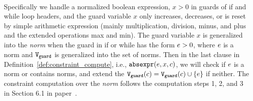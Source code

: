  \\
Specifically 
we handle a 
normalized boolean expression, $x > 0$
in guards of if and while loop headers, and 
the guard variable $x$ only increases, decreases, or is reset by 
simple arithmetic expression (mainly multiplication, division, minus, and plus and the extended operations max and min). 
The guard variable $x$ is generalized into the \emph{norm} when the guard 
in if or while has the form $e > 0$, where $e$ is a norm and $\mathtt{V}_{\mathtt{guard}}$ is generalized into the set of norms.
Then in the last clause in Definition~\ref{def:constraint_compute}, i.e., $\mathtt{abs}{\mathtt{expr}}(e, x, c)$,
we will check if $e$ is a norm or contains norms, and extend the $\mathtt{V}_{\mathtt{guard}}(c)= \mathtt{V}_{\mathtt{guard}}(c)\cup \{e\}$ if neither.
The constraint computation over the \emph{norm} follows the computation steps 1, 2, and 3 in Section 6.1 in paper~\cite{SinnZV17}. 
%
